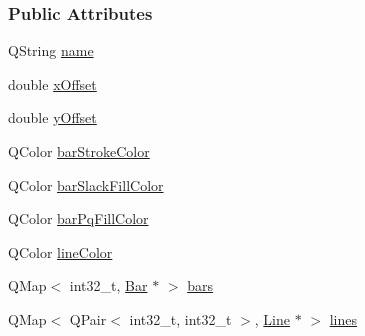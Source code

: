 \subsubsection*{Public Attributes}
\begin{DoxyCompactItemize}
\item 
Q\+String \hyperlink{class_network_ab6643733a517f930c60b06f5ffd78186}{name}
\item 
double \hyperlink{class_network_a9f5c70be28a45320802bd0ac3947d114}{x\+Offset}
\item 
double \hyperlink{class_network_a771b16f7eb4459d0ca7141c048b1ab59}{y\+Offset}
\item 
Q\+Color \hyperlink{class_network_ad69052271ab0a9899948815b6201f2c6}{bar\+Stroke\+Color}
\item 
Q\+Color \hyperlink{class_network_ad78d9a206daf4ba0780067b5043c7f5c}{bar\+Slack\+Fill\+Color}
\item 
Q\+Color \hyperlink{class_network_a386f492f548ec13f5d0e350c4f2217aa}{bar\+Pq\+Fill\+Color}
\item 
Q\+Color \hyperlink{class_network_a453db7f1a994603fe4d38ac5899eb09c}{line\+Color}
\item 
Q\+Map$<$ int32\+\_\+t, \hyperlink{class_bar}{Bar} $\ast$ $>$ \hyperlink{class_network_a7fe628f7de34a96235cbd3f2cee4aff2}{bars}
\item 
Q\+Map$<$ Q\+Pair$<$ int32\+\_\+t, int32\+\_\+t $>$, \hyperlink{class_line}{Line} $\ast$ $>$ \hyperlink{class_network_acda0fd42e712e460a08a0e96511ee7eb}{lines}
\end{DoxyCompactItemize}
